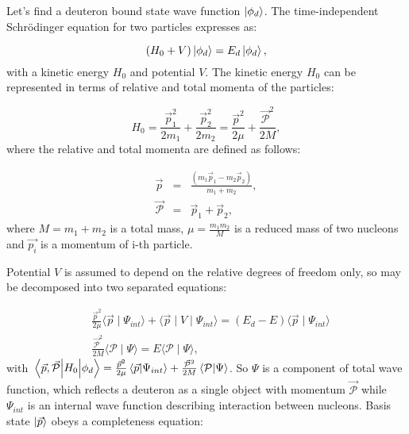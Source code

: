     Let's find a deuteron bound state wave function $\ket{\phi_d}$. 
    The time-independent Schr\"{o}dinger
    equation for two particles expresses as:

    \begin{equation}
        (H_0 + V) \ket{\phi_d}  = E_d \ket{\phi_d},
        \label{shrod_bound}
    \end{equation}
    with a kinetic energy $H_0$ and potential $V$. 
    The kinetic energy $H_0$ can be represented in terms of  relative and total momenta
    of the particles:

    \begin{equation}
        H_0 = \frac{\vec{p}_1^2}{2m_1} + \frac{\vec{p}_2^2}{2m_2} = 
        \frac{\vec{p}^2}{2\mu} + \frac{\vec{\mathcal{P}}^2}{2M}, 
    \end{equation}
    where the relative and total momenta are defined as follows:

    \begin{eqnarray}
        \vec{p} &=& \frac{(m_1\vec{p}_1 - m_2\vec{p}_2)}{m_1 + m_2},\\
        \vec{\mathcal{P}} &=& \vec{p}_1 + \vec{p}_2,
    \end{eqnarray}
    where $M = m_1 + m_2$ is a total mass, $\mu = \frac{m_1m_2}{M}$ is a reduced mass of two nucleons and 
    $\vec{p_i}$ is a momentum of i-th particle.

    Potential $V$ is assumed to depend on the relative degrees of freedom only, so
     may be decomposed into two separated equations:

    \begin{eqnarray}
        &\frac{\vec{p}^2}{2\mu} \langle \vec{p} \mid \Psi_{int} \rangle +
        \langle \vec{p} \mid V \mid \Psi_{int} \rangle = 
        (E_d - E)\langle \vec{p} \mid \Psi_{int} \rangle \label{se1}\\
        &\frac{\vec{\mathcal{P}}^2}{2M} \langle \mathcal{P} \mid \Psi \rangle = 
        E\langle \mathcal{P} \mid \Psi \rangle \label{se2},
    \end{eqnarray}
    with $\matrixel{\vec{p},\vec{\mathcal{P}}}{H_0}{\phi_d} = \frac{\vec{p}^2}{2\mu} \braket{\vec{p}}{\Psi_{int}} +
    \frac{\vec{\mathcal{P}}^2}{2M} \braket {\mathcal{P}} {\Psi} $. So $\Psi$ is a component 
    of total wave function, which reflects a deuteron as a single object with momentum $\vec{\mathcal{P}}$
    while $\Psi_{int}$ is an internal wave function describing interaction between nucleons.
    Basis state $\ket{\vec{p}}$  obeys a completeness
    equation:

